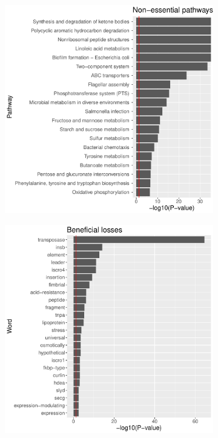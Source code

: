 \documentclass[12pt,letterpaper]{article}
\begin{document}
\begin{figure}
\begin{subfigure}{.5\textwidth}
  \caption{}
  \label{fig:essentiality-pathway-ess}
\end{subfigure}
\begin{subfigure}{.5\textwidth}
  \centering
  \includegraphics[scale=0.4]{non-essential-pathways.pdf}
  \caption{}
  \label{fig:essentiality-pathway-nes}
\end{subfigure}
\begin{subfigure}{.5\textwidth}
  \centering
  \includegraphics[scale=0.4]{beneficialloss-pval.pdf}

\end{subfigure}
\end{figure}
\end{document}
